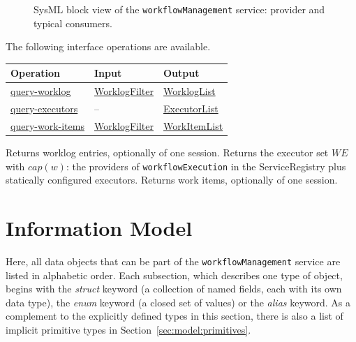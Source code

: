 \documentclass[a4paper]{arrowhead}
\newcommand{\mref}[1]{{\textcolor{ArrowheadPurple}{\hyperref[sec:model:#1]{#1}}}}
\newcommand{\oref}[1]{{\textcolor{ArrowheadBlue}{\hyperref[sec:operations:#1]{#1}}}}
\begin{document}
\begin{figure}[ht!]
  \centering
  \caption{SysML block view of the \texttt{workflowManagement} service: provider and typical consumers.}
  \label{fig:SD}
\end{figure}

The following interface operations are available.

{\small
\begin{longtable}{|p{4.4cm}|p{5.6cm}|p{5.8cm}|}

\hline
\rowcolor{gray!33} Operation & Input & Output \\ \hline
\endhead
\oref{query-worklog} & \mref{WorklogFilter} & \mref{WorklogList} \\ \hline
\oref{query-executors} & -- & \mref{ExecutorList} \\ \hline
\oref{query-work-items} & \mref{WorklogFilter} & \mref{WorkItemList} \\ \hline
\end{longtable}
}

Returns worklog entries, optionally of one session.
Returns the executor set $WE$ with $cap(w)$: the providers of \texttt{workflow\allowbreak{}Execution} in the ServiceRegistry plus statically configured executors.
Returns work items, optionally of one session.

\newpage
\section{Information Model}
\label{sec:model}
Here, all data objects that can be part of the \texttt{workflow\allowbreak{}Management} service are listed in alphabetic order. Each
subsection, which describes one type of object, begins with the \textit{struct} keyword (a collection of named fields,
each with its own data type), the \textit{enum} keyword (a closed set of values) or the \textit{alias} keyword. As a
complement to the explicitly defined types in this section, there is also a list of implicit primitive types in
Section~\ref{sec:model:primitives}.
\end{document}
